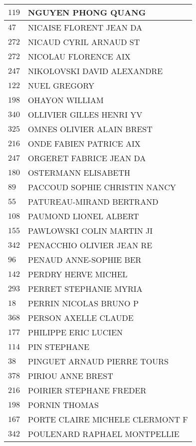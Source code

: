 \begin{xltabular}{\linewidth}{|l|X|}
    \hline
    $119$ & NGUYEN PHONG QUANG \\
    \hline
    $47$ & NICAISE FLORENT JEAN DA \\
    \hline
    $272$ & NICAUD CYRIL ARNAUD ST \\
    \hline
    $272$ & NICOLAU FLORENCE AIX \\
    \hline
    $247$ & NIKOLOVSKI DAVID ALEXANDRE \\
    \hline
    $122$ & NUEL GREGORY \\
    \hline
    $198$ & OHAYON WILLIAM \\
    \hline
    $340$ & OLLIVIER GILLES HENRI YV \\
    \hline
    $325$ & OMNES OLIVIER ALAIN BREST \\
    \hline
    $216$ & ONDE FABIEN PATRICE AIX \\
    \hline
    $247$ & ORGERET FABRICE JEAN DA \\
    \hline
    $180$ & OSTERMANN ELISABETH \\
    \hline
    $89$ & PACCOUD SOPHIE CHRISTIN NANCY \\
    \hline
    $55$ & PATUREAU-MIRAND BERTRAND \\
    \hline
    $108$ & PAUMOND LIONEL ALBERT \\
    \hline
    $155$ & PAWLOWSKI COLIN MARTIN JI \\
    \hline
    $342$ & PENACCHIO OLIVIER JEAN RE \\
    \hline
    $96$ & PENAUD ANNE-SOPHIE BER \\
    \hline
    $142$ & PERDRY HERVE MICHEL \\
    \hline
    $293$ & PERRET STEPHANIE MYRIA \\
    \hline
    $18$ & PERRIN NICOLAS BRUNO P \\
    \hline
    $368$ & PERSON AXELLE CLAUDE \\
    \hline
    $177$ & PHILIPPE ERIC LUCIEN \\
    \hline
    $114$ & PIN STEPHANE \\
    \hline
    $38$ & PINGUET ARNAUD PIERRE TOURS \\
    \hline
    $378$ & PIRIOU ANNE BREST \\
    \hline
    $216$ & POIRIER STEPHANE FREDER \\
    \hline
    $198$ & PORNIN THOMAS \\
    \hline
    $167$ & PORTE CLAIRE MICHELE CLERMONT F \\
    \hline
    $342$ & POULENARD RAPHAEL MONTPELLIE \\

\end{xltabular}
